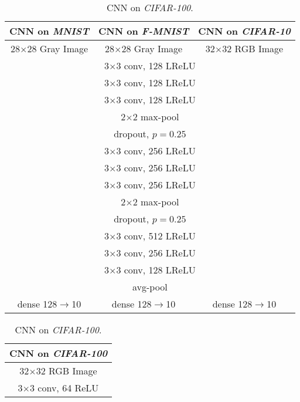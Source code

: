 \documentclass[11pt]{article}
\begin{document}
\begin{table}[!h]
    \begin{minipage}{0.55\linewidth}
	\centering
	\caption{CNN on \textit{MNIST}, \textit{F-MNIST}, and \textit{CIFAR-10}.}
	\label{tab:9layercnn}
	\scalebox{0.84}
	{
		\begin{tabular}{c | c | c }
			\hline
			CNN on \textit{MNIST} & CNN on \textit{F-MNIST} & CNN on \textit{CIFAR-10} \\ \hline
			28$\times$28 Gray Image & 28$\times$28 Gray Image  & 32$\times$32 RGB Image  \\ \hline
			\multicolumn{3}{c}{3$\times$3 conv, 128 LReLU }   \\
			\multicolumn{3}{c}{3$\times$3 conv, 128 LReLU }   \\
			\multicolumn{3}{c}{3$\times$3 conv, 128 LReLU }   \\ \hline
			\multicolumn{3}{c}{2$\times$2 max-pool} \\
			\multicolumn{3}{c}{dropout, $p=0.25$} \\ \hline
			\multicolumn{3}{c}{3$\times$3 conv, 256 LReLU }  \\
			\multicolumn{3}{c}{3$\times$3 conv, 256 LReLU }   \\
			\multicolumn{3}{c}{3$\times$3 conv, 256 LReLU }  \\ \hline
			\multicolumn{3}{c}{2$\times$2 max-pool} \\
			\multicolumn{3}{c}{dropout, $p=0.25$} \\ \hline
			\multicolumn{3}{c}{3$\times$3 conv, 512 LReLU } \\
			\multicolumn{3}{c}{3$\times$3 conv, 256 LReLU } \\
			\multicolumn{3}{c}{3$\times$3 conv, 128 LReLU }  \\ \hline
			\multicolumn{3}{c}{avg-pool} \\ \hline
            dense 128$\rightarrow$10 & dense 128$\rightarrow$10 & dense 128$\rightarrow$10 \\ \hline
		\end{tabular}
	}
	\end{minipage}
	\begin{minipage}{0.55\linewidth}
	\centering
	\caption{CNN on \textit{CIFAR-100}.}
	\label{tab:7layercnn}
	\scalebox{0.84}
	{
		\begin{tabular}{c}
			\hline
			CNN on \textit{CIFAR-100} \\ \hline
			32$\times$32 RGB Image  \\ \hline
			3$\times$3 conv, 64 ReLU    \\

\end{tabular}}
\end{minipage}
\end{table}
\end{document}
